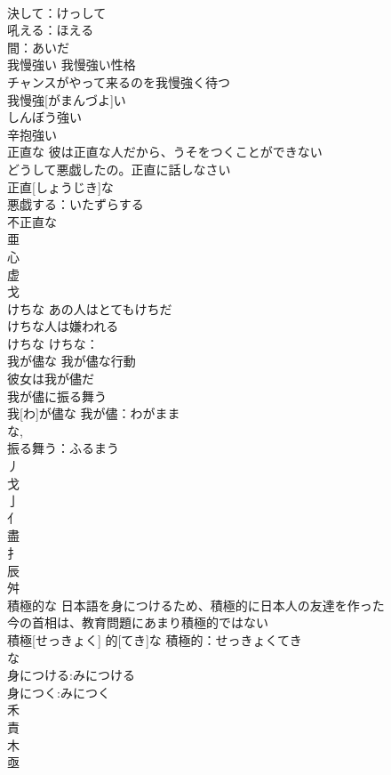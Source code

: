 \documentclass[8pt]{extreport}
\begin{document}
\begin{CJK}{UTF8}{min}
\\	決して：けっして
\\	吼える：ほえる
\\	間：あいだ
\\	我慢強い	我慢強い性格 
\\	チャンスがやって来るのを我慢強く待つ 
\\	我慢強[がまんづよ]い			
\\	しんぼう強い 
\\	辛抱強い	
\\	正直な	彼は正直な人だから、うそをつくことができない 
\\	どうして悪戯したの。正直に話しなさい 
\\	正直[しょうじき]な			
\\	悪戯する：いたずらする
\\	不正直な 
\\	亜 
\\	心 
\\	虚 
\\	戈 
\\	けちな	あの人はとてもけちだ 
\\	けちな人は嫌われる 
\\	けちな			けちな：
\\	我が儘な	我が儘な行動 
\\	彼女は我が儘だ 
\\	我が儘に振る舞う 
\\	我[わ]が儘な			我が儘：わがまま
\\	な, 
\\	振る舞う：ふるまう
\\	丿 
\\	戈 
\\	亅 
\\	亻 
\\	盡 
\\	扌 
\\	辰 
\\	舛 
\\	積極的な	日本語を身につけるため、積極的に日本人の友達を作った 
\\	今の首相は、教育問題にあまり積極的ではない 
\\	積極[せっきょく] 的[てき]な			積極的：せっきょくてき
\\	な
\\	身につける:みにつける
\\	身につく:みにつく
\\	禾 
\\	責 
\\	木 
\\	亟 

\end{CJK}
\end{document}

